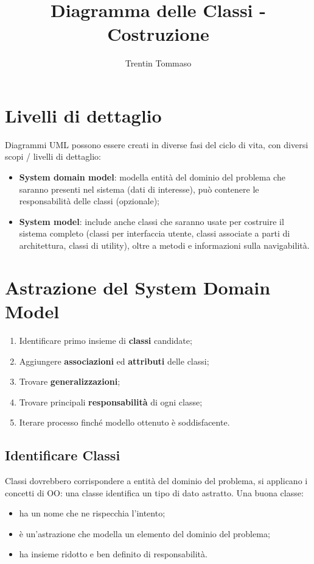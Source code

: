 \documentclass{article}
\title{Diagramma delle Classi - Costruzione}
\author{Trentin Tommaso}
\begin{document}
  \section{Livelli di dettaglio}
    Diagrammi UML possono essere creati in diverse fasi del ciclo di vita, con diversi scopi / livelli di dettaglio:
    \begin{itemize}
      \item \textbf{System domain model}: modella entità del dominio del problema che saranno presenti nel sistema (dati di interesse), può contenere le responsabilità delle classi (opzionale); 
      \item \textbf{System model}: include anche classi che saranno usate per costruire il sistema completo (classi per interfaccia utente, classi associate a parti di architettura, classi di utility), oltre a metodi e informazioni sulla navigabilità. 
    \end{itemize}
  \section{Astrazione del System Domain Model}
    \begin{enumerate}
      \item Identificare primo insieme di \textbf{classi} candidate; 
      \item Aggiungere \textbf{associazioni} ed \textbf{attributi} delle classi;
      \item Trovare \textbf{generalizzazioni};
      \item Trovare principali \textbf{responsabilità} di ogni classe;
      \item Iterare processo finché modello ottenuto è soddisfacente.
    \end{enumerate}
    \subsection{Identificare Classi}
      Classi dovrebbero corrispondere a entità del dominio del problema, si applicano i concetti di OO: una classe identifica un tipo di dato astratto. Una buona classe:
      \begin{itemize}
        \item ha un nome che ne rispecchia l'intento; 
        \item è un'astrazione che modella un elemento del dominio del problema;
        \item ha insieme ridotto e ben definito di responsabilità.
      \end{itemize}
\end{document}
